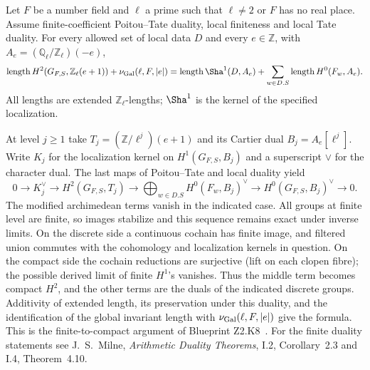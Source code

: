 \begin{formalstatement}\label{pn:P040}
Let \(F\) be a number field and \(\ell\) a prime such that \(\ell\ne2\)
or \(F\) has no real place. Assume finite-coefficient Poitou--Tate
duality, local finiteness and local Tate duality. For every allowed
set of local data \(D\) and every \(e\in\mathbb Z\), with
\(A_e=(\mathbb Q_\ell/\mathbb Z_\ell)(-e)\),
\[
 \operatorname{length}H^2(G_{F,S},\mathbb Z_\ell(e+1))
      +\nu_{\rm Gal}(\ell,F,|e|)
   =\operatorname{length}\Sha^1(D,A_e)
      +\sum_{w\in D.S}\operatorname{length}H^0(F_w,A_e).
\]
All lengths are extended \(\mathbb Z_\ell\)-lengths;
\(\Sha^1\) is the kernel of the specified localization.
\end{formalstatement}
\begin{outline}
At level \(j\ge1\) take \(T_j=(\mathbb Z/\ell^j)(e+1)\) and its
Cartier dual \(B_j=A_e[\ell^j]\). Write \(K_j\) for the localization
kernel on \(H^1(G_{F,S},B_j)\) and a superscript \(\vee\) for the
character dual. The last maps of Poitou--Tate and local duality yield
\[
 0\longrightarrow K_j^\vee\longrightarrow H^2(G_{F,S},T_j)
 \longrightarrow\bigoplus_{w\in D.S} H^0(F_w,B_j)^\vee
 \longrightarrow H^0(G_{F,S},B_j)^\vee\longrightarrow0 .
\]
The modified archimedean terms vanish in the indicated case. All
groups at finite level are finite, so images stabilize and this
sequence remains exact under inverse limits. On the discrete side
a continuous cochain has finite image, and filtered union commutes
with the cohomology and localization kernels in question. On the
compact side the cochain reductions are surjective (lift on each
clopen fibre); the possible derived limit of finite \(H^1\)'s
vanishes. Thus the middle term becomes compact \(H^2\), and the
other terms are the duals of the indicated discrete groups.
Additivity of extended length, its preservation under this duality,
and the identification of the global invariant length with
\(\nu_{\rm Gal}(\ell,F,|e|)\) give the formula. This is the
finite-to-compact argument of Blueprint Z2.K8~. For the finite
duality statements see J.~S.~Milne, \emph{Arithmetic Duality Theorems},
I.2, Corollary~2.3 and I.4, Theorem~4.10.
\cite{r21-adt}
\end{outline}
